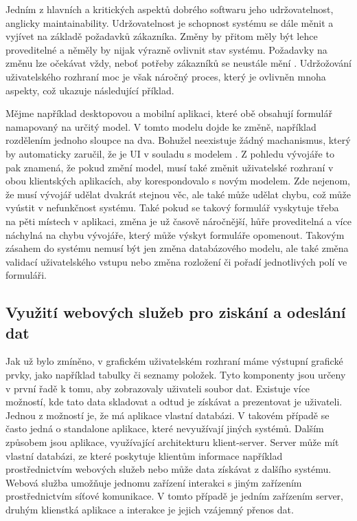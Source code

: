 Jedním z hlavních a kritických aspektů dobrého softwaru jeho udržovatelnost, anglicky maintainability. Udržovatelnost je schopnost systému se dále měnit a vyjívet na základě požadavků zákazníka. Změny by přitom měly být lehce proveditelné a něměly by nijak výrazně ovlivnit stav systému. Požadavky na změnu lze očekávat vždy, neboť potřeby zákazníků se neustále mění \cite{sommerville}. Udržožování uživatelského rozhraní moc je však náročný proces, který je ovlivněn mnoha aspekty, což ukazuje následující příklad.

Mějme například desktopovou a mobilní aplikaci, které obě obsahují formulář namapovaný na určitý model. V tomto modelu dojde ke změně, například rozdělením jednoho sloupce na dva. Bohužel neexistuje žádný machanismus, který by automaticky zaručil, že je UI v souladu s modelem \cite{cernyTEA}. Z pohledu vývojáře to pak znamená, že pokud změní model, musí také změnit uživatelské rozhraní v obou klientských aplikacích, aby korespondovalo s novým modelem. Zde nejenom, že musí vývojář udělat dvakrát stejnou věc, ale také může udělat chybu, což může vyústit v nefunkčnost systému. Také pokud se takový formulář vyskytuje třeba na pěti místech v aplikaci, změna je už časově náročnější, hůře proveditelná a více náchylná na chybu vývojáře, který může výskyt formuláře opomenout.
Takovým zásahem do systému nemusí být jen změna databázového modelu, ale také změna validací uživatelského vstupu nebo změna rozložení či pořadí jednotlivých polí ve formuláři.

\subsection{Využití webových služeb pro ziskání a odeslání dat}
Jak už bylo zmíněno, v grafickém uživatelském rozhraní máme výstupní grafické prvky, jako například tabulky či seznamy položek. Tyto komponenty jsou určeny v první řadě k tomu, aby zobrazovaly uživateli soubor dat. Existuje více možností, kde tato data skladovat a odtud je získávat a prezentovat je uživateli. Jednou z možností je, že má aplikace vlastní databázi. V takovém případě se často jedná o standalone aplikace, které nevyužívají jiných systémů. Dalším způsobem jsou aplikace, využívající architekturu klient-server. Server může mít vlastní databázi, ze které poskytuje klientům informace například prostřednictvím webových služeb nebo může data získávat z dalšího systému. Webová služba umožňuje jednomu zařízení interakci s jiným zařízením prostřednictvím síťové komunikace\cite{wiki-ws}. V tomto případě je jedním zařízením server, druhým klienstká aplikace a interakce je jejich vzájemný přenos dat. 

